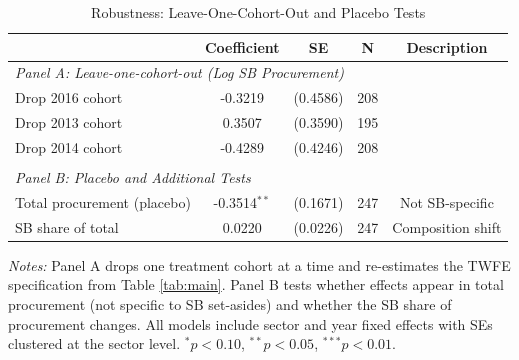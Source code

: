 \begin{table}[htbp]
\centering
\begin{threeparttable}
\caption{Robustness: Leave-One-Cohort-Out and Placebo Tests}
\label{tab:robustness}
\begin{tabular}{lcccc}
\toprule
 & Coefficient & SE & N & Description \\
\midrule
\multicolumn{5}{l}{\textit{Panel A: Leave-one-cohort-out (Log SB Procurement)}} \\
Drop 2016 cohort & -0.3219 & (0.4586) & 208 & \\
Drop 2013 cohort & 0.3507 & (0.3590) & 195 & \\
Drop 2014 cohort & -0.4289 & (0.4246) & 208 & \\
 & & & & \\
\multicolumn{5}{l}{\textit{Panel B: Placebo and Additional Tests}} \\
Total procurement (placebo) & -0.3514$^{**}$ & (0.1671) & 247 & Not SB-specific \\
SB share of total & 0.0220 & (0.0226) & 247 & Composition shift \\
\bottomrule
\end{tabular}
\begin{tablenotes}
\item \textit{Notes:} Panel A drops one treatment cohort at a time and re-estimates the TWFE specification from Table \ref{tab:main}. Panel B tests whether effects appear in total procurement (not specific to SB set-asides) and whether the SB share of procurement changes. All models include sector and year fixed effects with SEs clustered at the sector level. $^{*}p<0.10$, $^{**}p<0.05$, $^{***}p<0.01$.
\end{tablenotes}
\end{threeparttable}
\end{table}
